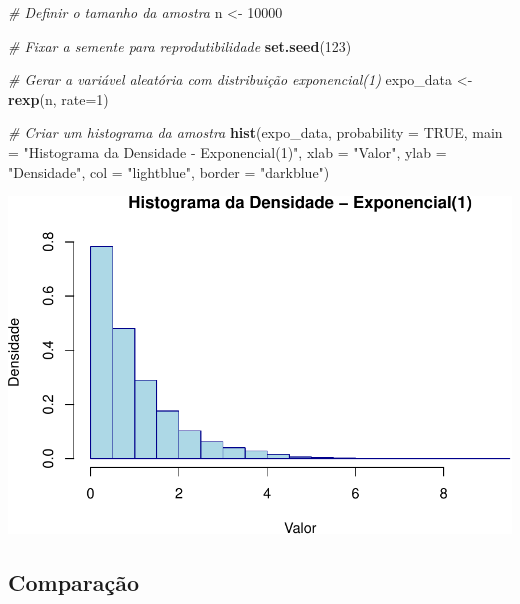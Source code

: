 \documentclass[
]{book}
\newenvironment{Shaded}{\begin{snugshade}}{\end{snugshade}}
\newcommand{\AttributeTok}[1]{\textcolor[rgb]{0.13,0.29,0.53}{#1}}
\newcommand{\CommentTok}[1]{\textcolor[rgb]{0.56,0.35,0.01}{\textit{#1}}}
\newcommand{\ConstantTok}[1]{\textcolor[rgb]{0.56,0.35,0.01}{#1}}
\newcommand{\DecValTok}[1]{\textcolor[rgb]{0.00,0.00,0.81}{#1}}
\newcommand{\FunctionTok}[1]{\textcolor[rgb]{0.13,0.29,0.53}{\textbf{#1}}}
\newcommand{\NormalTok}[1]{#1}
\newcommand{\OtherTok}[1]{\textcolor[rgb]{0.56,0.35,0.01}{#1}}
\newcommand{\StringTok}[1]{\textcolor[rgb]{0.31,0.60,0.02}{#1}}
\theoremstyle{definition}
\theoremstyle{definition}
\theoremstyle{definition}
\theoremstyle{definition}
\theoremstyle{remark}
\begin{document}
\begin{Shaded}
\begin{Highlighting}[]
\CommentTok{\# Definir o tamanho da amostra}
\NormalTok{n }\OtherTok{\textless{}{-}} \DecValTok{10000}

\CommentTok{\# Fixar a semente para reprodutibilidade}
\FunctionTok{set.seed}\NormalTok{(}\DecValTok{123}\NormalTok{)}

\CommentTok{\# Gerar a variável aleatória com distribuição exponencial(1)}
\NormalTok{expo\_data }\OtherTok{\textless{}{-}} \FunctionTok{rexp}\NormalTok{(n, }\AttributeTok{rate=}\DecValTok{1}\NormalTok{)}

\CommentTok{\# Criar um histograma da amostra }
\FunctionTok{hist}\NormalTok{(expo\_data, }\AttributeTok{probability =} \ConstantTok{TRUE}\NormalTok{, }
     \AttributeTok{main =} \StringTok{"Histograma da Densidade {-} Exponencial(1)"}\NormalTok{, }
     \AttributeTok{xlab =} \StringTok{"Valor"}\NormalTok{, }
     \AttributeTok{ylab =} \StringTok{"Densidade"}\NormalTok{, }
     \AttributeTok{col =} \StringTok{"lightblue"}\NormalTok{, }
     \AttributeTok{border =} \StringTok{"darkblue"}\NormalTok{)}
\end{Highlighting}
\end{Shaded}

\includegraphics{meuLivro2_files/figure-latex/unnamed-chunk-124-1.pdf}

\subsection{Comparação}\label{comparauxe7uxe3o-3}
\end{document}
